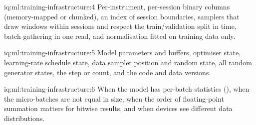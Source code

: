 \begin{solution}{iq:ml:training-infrastructure:4}
Per-instrument, per-session binary columns (memory-mapped or chunked), an index of session boundaries, samplers that draw windows
within sessions and respect the train/validation split in time, batch gathering in one read, and normalisation fitted on training
data only.
\end{solution}

\begin{solution}{iq:ml:training-infrastructure:5}
Model parameters and buffers, optimiser state, learning-rate schedule state, data sampler position and random state, all random
generator states, the step or  count, and the code and data versions.
\end{solution}

\begin{solution}{iq:ml:training-infrastructure:6}
When the model has per-batch statistics (), when the micro-batches are not equal in size, when the order of
floating-point summation matters for bitwise results, and when devices see different data distributions.
\end{solution}
